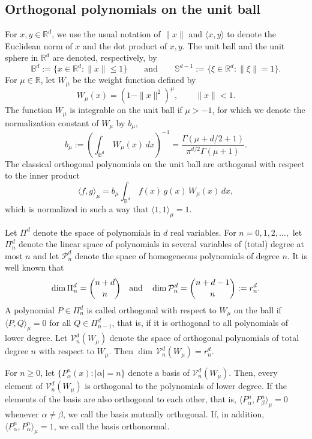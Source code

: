 \documentclass{amsart}
\theoremstyle{plain}%
\theoremstyle{definition}
\theoremstyle{remark}
\begin{document}
\subsection{Orthogonal polynomials on the unit ball}
For $x,y  \in \mathbb{R}^d$, we use the usual notation of $\|x\|$ and $\langle x,y \rangle $ to denote the Euclidean 
norm of $x$ and the dot product of $x,y$.  The unit ball and the unit sphere in $\mathbb{R}^d$ are 
{denoted}, respectively, by
$$
\mathbb{B}^d :=\{x\in \mathbb{R}^d: \|x\| \le 1\} \qquad \textrm{and} \qquad \mathbb{S}^{d-1}:=\{\xi\in \mathbb{R}^d: \|\xi\| = 1\}.
$$
For $\mu \in \mathbb{R}$, let $W_\mu$ be the weight function defined by
$$
    W_\mu(x) = (1-\|x\|^2)^\mu, \qquad  \|x\| < 1.
$$
The function $W_\mu$ is integrable on the unit {ball} if $\mu > -1$, for which we denote the normalization 
constant of $W_\mu$ by ${b_\mu}$, 
\[
b_\mu := \left(\int_{{\mathbb{B}^d}}\, W_\mu(x) \, dx\right)^{-1} = \frac{\Gamma(\mu + d/2 + 1)}{\pi^{d/2}\Gamma(\mu+1)}.
\]
The classical orthogonal polynomials on the unit ball are orthogonal with respect to the inner product
\begin{equation}\label{ball-ip}
   \langle f, g \rangle _\mu = b_\mu \int_{{\mathbb{B}^d}}\, f(x)\, g(x) \, W_\mu(x) \, dx,
\end{equation}
which is normalized in such a way that $\langle 1,1\rangle_\mu = 1$. 

Let $\Pi^d$ denote the space of polynomials in $d$ real variables. For $n = 0,1,2,\ldots,$
let $\Pi_n^d$ denote the linear space of polynomials in several variables of (total) degree 
at most $n$ and let $\mathcal{P}_n^d$ denote the space of homogeneous polynomials of degree 
$n$. It is well known that 
\[
  \dim \Pi_n^d = \binom{n+d}{n} \quad \hbox{and} \quad \dim \mathcal{P}_n^d = \binom{n+d-1}{n}:= r_n^d.
\]
A polynomial $P \in \Pi_n^d$ is called orthogonal with respect to $W_\mu$ on the ball if 
$\langle P, Q\rangle_\mu =0$ for all $Q \in \Pi_{n-1}^d$, that is, if it is orthogonal to all polynomials of lower degree. Let $\mathcal{V}_n^d(W_\mu)$ denote the space of orthogonal polynomials of total degree $n$ with respect to \(W_\mu\). Then $\dim \, \mathcal{V}_n^d(W_\mu) = r_n^d.$

For $n\ge 0$, let $\{P^n_{\alpha}(x) : |\alpha|=n\}$ denote a basis of $\mathcal{V}_n^d(W_\mu)$. 
Then, every element of $\mathcal{V}_n^d(W_\mu)$ is orthogonal to the polynomials of lower degree. If the 
elements of the basis are also orthogonal to each other, that is, $\langle  P_\alpha^n, P_\beta^n \rangle _\mu=0$ whenever \(\alpha \ne \beta\), we call the basis mutually orthogonal. If, in addition, $\langle P_\alpha^n, P_\alpha^n \rangle _\mu =1$, we call the basis orthonormal. 
\end{document}
